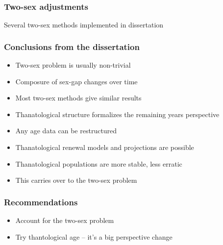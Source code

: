 \documentclass{beamer}
\begin{document}

\begin{frame}
  \frametitle{Two-sex adjustments}
  Several two-sex methods implemented in dissertation
\end{frame}


\begin{frame}
  \frametitle{Conclusions from the dissertation}
  \begin{itemize}
    \item Two-sex problem is usually non-trivial
    \item Composure of sex-gap changes over time
    \item Most two-sex methods give similar results
    \item Thanatological structure formalizes the remaining years perspective
    \item Any age data can be restructured
    \item Thanatological renewal models and projections are possible
    \item Thanatological populations are more stable, less erratic
    \item This carries over to the two-sex problem 
  \end{itemize}
\end{frame}


\begin{frame}
  \frametitle{Recommendations}
  \begin{itemize}
    \item Account for the two-sex problem
    \item Try thantological age -- it's a big perspective change
  \end{itemize}
\end{frame}

\begin{frame}
  
\end{frame}

\end{document}
